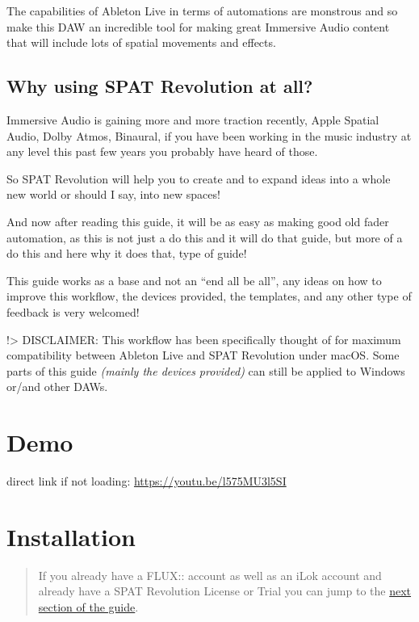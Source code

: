 \documentclass[
  letterpaper,
  DIV=11,
  numbers=noendperiod]{scrreport}
\begin{document}
The capabilities of Ableton Live in terms of automations are monstrous
and so make this DAW an incredible tool for making great Immersive Audio
content that will include lots of spatial movements and effects.

\hypertarget{why-using-spat-revolution-at-all}{%
\subsection{Why using SPAT Revolution at
all?}\label{why-using-spat-revolution-at-all}}

Immersive Audio is gaining more and more traction recently, Apple
Spatial Audio, Dolby Atmos, Binaural, if you have been working in the
music industry at any level this past few years you probably have heard
of those.

So SPAT Revolution will help you to create and to expand ideas into a
whole new world or should I say, into new spaces!

And now after reading this guide, it will be as easy as making good old
fader automation, as this is not just a do this and it will do that
guide, but more of a do this and here why it does that, type of guide!

This guide works as a base and not an ``end all be all'', any ideas on
how to improve this workflow, the devices provided, the templates, and
any other type of feedback is very welcomed!

!\textgreater{} DISCLAIMER: This workflow has been specifically thought
of for maximum compatibility between Ableton Live and SPAT Revolution
under macOS. Some parts of this guide \emph{(mainly the devices
provided)} can still be applied to Windows or/and other DAWs.

\hypertarget{demo}{%
\section{Demo}\label{demo}}

direct link if not loading: \url{https://youtu.be/l575MU3l5SI}

\hypertarget{installation-1}{%
\section{Installation}\label{installation-1}}

\begin{quote}
If you already have a FLUX:: account as well as an iLok account and
already have a SPAT Revolution License or Trial you can jump to the
\href{https://doc.flux.audio/\#/en_US/spat_revolution_doc/Third_Party_Ableton_Live_Tools_for_SPAT_Revolution?id=tools}{next
section of the guide}.
\end{quote}
\end{document}
